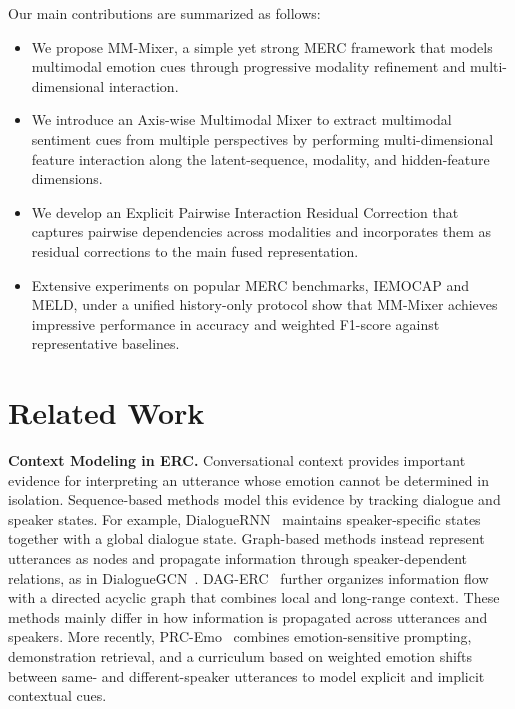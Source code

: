 \documentclass[letterpaper]{article} %
\begin{document}

Our main contributions are summarized as follows:
\begin{itemize}
\item We propose MM-Mixer, a simple yet strong MERC framework that models multimodal emotion cues through progressive modality refinement and multi-dimensional interaction.
\item We introduce an Axis-wise Multimodal Mixer to extract multimodal sentiment cues from multiple perspectives by performing multi-dimensional feature interaction along the latent-sequence, modality, and hidden-feature dimensions.
\item We develop an Explicit Pairwise Interaction Residual Correction that captures pairwise dependencies across modalities and incorporates them as residual corrections to the main fused representation. 

\item Extensive experiments on popular MERC benchmarks, IEMOCAP and MELD, under a unified history-only protocol show that  MM-Mixer achieves impressive performance in accuracy and weighted F1-score against representative baselines.
\end{itemize}
\section{Related Work}

\noindent\textbf{Context Modeling in ERC.}
Conversational context provides important evidence for interpreting an utterance whose emotion cannot be determined in isolation. Sequence-based methods model this evidence by tracking dialogue and speaker states. For example, DialogueRNN~\cite{dialoguernn} maintains speaker-specific states together with a global dialogue state. Graph-based methods instead represent utterances as nodes and propagate information through speaker-dependent relations, as in DialogueGCN~\cite{dialoguegcn}. DAG-ERC~\cite{dagerc} further organizes information flow with a directed acyclic graph that combines local and long-range context. These methods mainly differ in how information is propagated across utterances and speakers. More recently, PRC-Emo~\cite{prcemo} combines emotion-sensitive prompting, demonstration retrieval, and a curriculum based on weighted emotion shifts between same- and different-speaker utterances to model explicit and implicit contextual cues.
\end{document}
